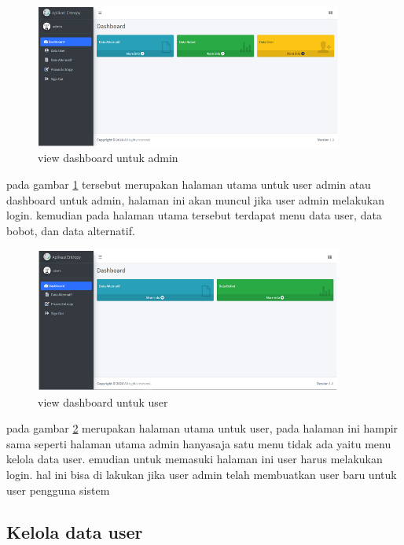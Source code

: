 \begin{figure}[!htbp]
	\centerline{\includegraphics[width=0.90\textwidth]{figures/view/6.png}}
	\caption{view dashboard untuk admin}
	\label{dla6}
\end{figure}

pada gambar \ref{dla6} tersebut merupakan halaman utama untuk user admin atau dashboard untuk admin, halaman ini akan muncul jika user admin melakukan login. kemudian pada halaman utama tersebut terdapat menu data user, data bobot, dan data alternatif.

\begin{figure}[!htbp]
	\centerline{\includegraphics[width=0.90\textwidth]{figures/view/5.png}}
	\caption{view dashboard untuk user}
	\label{dlu6}
\end{figure}

pada gambar \ref{dlu6} merupakan halaman utama untuk user, pada halaman ini hampir sama seperti halaman utama admin hanyasaja satu menu tidak ada yaitu menu kelola data user. emudian untuk memasuki halaman ini user harus melakukan login. hal ini bisa di lakukan jika user admin telah membuatkan user baru untuk user pengguna sistem
\pagebreak
\subsection{Kelola data user}


